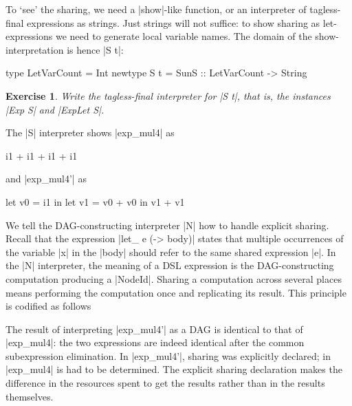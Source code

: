 \documentclass[submission,copyright,creativecommons]{eptcs}
\newtheorem{Exercise}{Exercise} \newcommand\aside[1]{}
\begin{document}
To `see' the sharing, we need a |show|-like function, or an
interpreter of tagless-final expressions as strings. Just strings will
not suffice: to show sharing as let-expressions we need to generate
local variable names. The domain of the show-interpretation is hence
|S t|:
\begin{code}
type LetVarCount = Int
newtype S t = S{unS :: LetVarCount -> String}
\end{code}
\begin{Exercise}
Write the tagless-final interpreter for |S t|, that is, 
the instances |Exp S| and |ExpLet S|.
\end{Exercise}
The |S| interpreter shows |exp_mul4| as
\begin{code}
i1 + i1 + i1 + i1
\end{code}
and |exp_mul4'| as
\begin{code}
let v0 = i1 in let v1 = v0 + v0 in v1 + v1
\end{code}


We tell the DAG-constructing interpreter |N| how to handle explicit
sharing.  Recall that the expression |let_ e (\x -> body)| states that
multiple occurrences of the variable |x| in the |body| should refer to
the same shared expression |e|. In the |N| interpreter, the meaning of
a DSL expression is the DAG-constructing computation producing a
|NodeId|. Sharing a computation across several places means performing
the computation once and replicating its result. This principle is
codified as follows
The result of interpreting |exp_mul4'| as a DAG is identical to that
of |exp_mul4|: the two expressions are indeed identical after the
common subexpression elimination. In |exp_mul4'|, sharing was
explicitly declared; in |exp_mul4| is had to be determined. The
explicit sharing declaration makes the difference in the resources
spent to get the results rather than in the results themselves.
\end{document}

